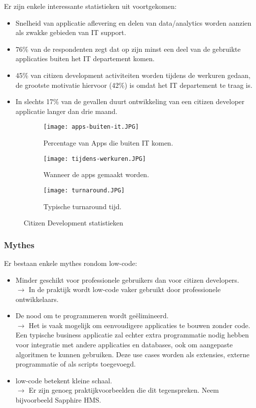 Er zijn enkele interessante statistieken uit voortgekomen:
\begin{itemize}
    \item Snelheid van applicatie aflevering en delen van data/analytics worden aanzien als zwakke gebieden van IT support.
    \item 76\% van de respondenten zegt dat op zijn minst een deel van de gebruikte applicaties buiten het IT departement komen.
    \item 45\% van citizen development activiteiten worden tijdens de werkuren gedaan, de grootste motivatie hiervoor (42\%) is omdat het IT departement te traag is.
    \item In slechts 17\% van de gevallen duurt ontwikkeling van een citizen developer applicatie langer dan drie maand.
\end{itemize}

\begin{figure}[h!]
    \centering
    \begin{subfigure}[b]{0.4\linewidth}
        \texttt{[image: apps-buiten-it.JPG]}
        \caption{Percentage van Apps die buiten IT komen.}
    \end{subfigure}
    \begin{subfigure}[b]{0.45\linewidth}
        \texttt{[image: tijdens-werkuren.JPG]}
        \caption{Wanneer de apps gemaakt worden.}
    \end{subfigure}
    \begin{subfigure}[b]{0.45\linewidth}
    \texttt{[image: turnaround.JPG]}
    \caption{Typische turnaround tijd.}
    \end{subfigure}
    \caption{Citizen Development statistieken \autocite{McKendrick2017}}
    \label{fig:test2cols}
\end{figure}

\subsubsection{Mythes}

Er bestaan enkele mythes rondom low-code:
\begin{itemize}
    \item Minder geschikt voor professionele gebruikers dan voor citizen developers. \\
    $\rightarrow$ In de praktijk wordt low-code vaker gebruikt door professionele ontwikkelaars.
    \item De nood om te programmeren wordt geëlimineerd. \\
    $\rightarrow$ Het is vaak mogelijk om eenvoudigere applicaties te bouwen zonder code. Een typische business applicatie zal echter extra programmatie nodig hebben voor integratie met andere applicaties en databases, ook om aangepaste algoritmen te kunnen gebruiken. Deze use cases worden als extensies, externe programmatie of als scripts toegevoegd.
    \item low-code betekent kleine schaal. \\
    $\rightarrow$ Er zijn genoeg praktijkvoorbeelden die dit tegenspreken. Neem bijvoorbeeld Sapphire HMS. \autocite{Bashar2017}
\end{itemize} \autocite{Richardson2016}

